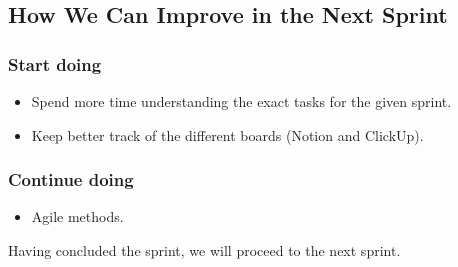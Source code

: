 \subsection{How We Can Improve in the Next Sprint}
\subsubsection{Start doing}
\begin{itemize}
    \item Spend more time understanding the exact tasks for the given sprint.
    \item Keep better track of the different boards (Notion and ClickUp).
\end{itemize}
\subsubsection{Continue doing}
\begin{itemize}
    \item Agile methods.
\end{itemize}

Having concluded the sprint, we will proceed to the next sprint.